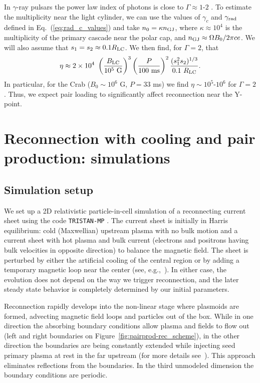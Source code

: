 In $\gamma$-ray pulsars the power law index of photons is close to $\Gamma\approx 1\text{-}2$ \citep{2013ApJS..208...17A}. To estimate the multiplicity near the light cylinder, we can use the values of $\gamma_c$ and $\gamma_{\rm rad}$ defined in Eq.~(\ref{eq:rad_c_values}) and take $n_0 = \kappa n_{\rm GJ}$, where $\kappa\approx 10^4$ is the multiplicity of the primary cascade near the polar cap, and $n_{\rm GJ}\approx\Omega B_0 / 2\pi c e$. We will also assume that $s_1 = s_2 \approx 0.1 R_{\rm LC}$. We then find, for $\Gamma=2$, that
\begin{equation}\label{eq:obs_mult_theory}
    \eta \approx 2\times 10^4~
    \left(\frac{B_{\rm LC}}{10^5~\text{G}}\right)^{3}
    \left(\frac{P}{100~\text{ms}}\right)^{2}
    \frac{(s_1^2 s_2)^{1/3}}{0.1~R_{\rm LC}}.
\end{equation}
In particular, for the Crab ($B_0\sim 10^6$ G, $P=33$ ms) we find $\eta\sim 10^5\text{-}10^6$ for $\Gamma=2$. Thus, we expect pair loading to significantly affect reconnection near the Y-point.


\section{Reconnection with cooling and pair production: simulations}
\label{sec:pairprod-results}

\subsection*{Simulation setup}

We set up a 2D relativistic particle-in-cell simulation of a reconnecting current sheet using the code \texttt{TRISTAN-MP} \citep{2005AIPC..801..345S}. The current sheet is initially in Harris equilibrium: cold (Maxwellian) upstream plasma with no bulk motion and a current sheet with hot plasma and bulk current (electrons and positrons having bulk velocities in opposite direction) to balance the magnetic field. The sheet is perturbed by either the artificial cooling of the central region or by adding a temporary magnetic loop near the center (see, e.g.,~\citealt{2018MNRAS.473.4840W}). In either case, the evolution does not depend on the way we trigger reconnection, and the later steady state behavior is completely determined by our initial parameters.

Reconnection rapidly develops into the non-linear stage where plasmoids are formed, advecting magnetic field loops and particles out of the box. While in one direction the absorbing boundary conditions allow plasma and fields to flow out (left and right boundaries on Figure~\ref{fig:pairprod-rec_scheme}), in the other direction the boundaries are being constantly extended while injecting seed primary plasma at rest in the far upstream (for more details see~\citealt{2014ApJ...783L..21S}). This approach eliminates reflections from the boundaries. In the third unmodeled dimension the boundary conditions are periodic.

